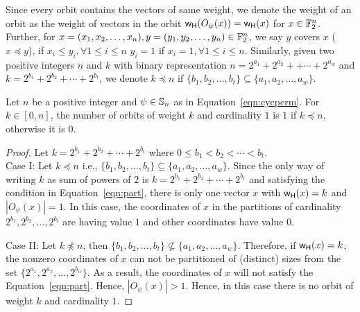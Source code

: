 \documentclass{llncs}
\begin{document}
\iffalse
\begin{proof}
For a vector $x \in \F_2^n$ is having an orbit of cardinality $1$ i.e., $|O_\psi(x)| = 1$ if and only if the coordinates of $x$ present in the cycles are of same value i.e., 
\begin{align}\label{eqn:part}
 & x_1  = x_2 = \ldots = x_{n_1}; \nonumber\\
 & x_{n_1+1}  = x_{n_1+2} = \ldots = x_{n_1+n_2}; \nonumber\\
& \vdots \\
 & x_{n-n_w+1}  = x_{n-n_w+2} = \ldots = x_n. \nonumber
\end{align}
As each partition of coordinates can be either $0$ or $1$, there are $2^w$ vectors $x$ in $\F_2^n$ satisfying Equation~\ref{eqn:part} and hence $|O_\psi(x)| = 1$.
\end{proof}
\fi
Since every orbit contains the vectors of same weight, we denote the weight of an orbit as the weight of vectors in the orbit \ie $\mathsf{w_H}(O_\psi(x)) = \mathsf{w_H}(x)$ for $x \in \F_2^n$. Further, for $x = (x_1, x_2,\ldots, x_n), y = (y_1, y_2, \ldots, y_n) \in \mathbb{F}_2^n$, we say $y$ covers $x$ (\ie $x \preceq y $), if $x_{i} \leq y_{i}, \forall 1 \leq i \leq n$ \ie $y_i = 1$ if $x_i = 1, \forall 1 \leq i \leq n$.
Similarly, given two positive integers $n$ and $k$ with binary representation $n = 2^{a_1} + 2^{a_2} + + \cdots + 2^{a_w}$ and $k = 2^{b_1}+ 2^{b_2} + \cdots + 2^{b_t}$, we denote $k \preceq n$ if $\{b_1, b_2, \ldots, b_t\} \subseteq \{a_1, a_2, \ldots, a_w\}$.
\begin{lemma}
Let $n$ be a positive integer and $\psi \in \mathbb{S}_n$ as in Equation~\ref{eqn:cycperm}. For $k \in [0,n]$, the number of orbits of weight $k$ and cardinality $1$ is $1$ if $k \preceq n$, otherwise it is $0$.
\end{lemma}
\iffalse
\begin{proof}
Let $k = 2^{b_1}+ 2^{b_2} + \cdots + 2^{b_t}$ where $0 \leq b_1 < b_2 < \cdots < b_t$.\\
Case I: Let $k \preceq n$ i.e., $\{b_1, b_2, \ldots, b_t\} \subseteq \{a_1, a_2, \ldots, a_w\}$. Since the only way of writing $k$ as sum of powers of $2$ is $k = 2^{b_1}+ 2^{b_2} + \cdots + 2^{b_t}$ and satisfying the condition in Equation~\ref{eqn:part}, there is only one vector $x$ with $\mathsf{w_H}(x) = k$ and $|O_\psi(x)| = 1$. In this case, the coordinates of $x$ in the partitions of cardinality $2^{b_1}, 2^{b_2}, \ldots, 2^{b_t}$ are having value $1$ and other coordinates have value $0$.

\noindent Case II: Let $k \not\preceq n$, then $\{b_1, b_2, \ldots, b_t\} \not \subseteq \{a_1, a_2, \ldots, a_w\}$. Therefore, if $\mathsf{w_H}(x) = k$, the nonzero coordinates of $x$ can not be partitioned of (distinct) sizes from the set $\{2^{a_1}, 2^{a_2}, \ldots, 2^{b_w}\}$.
As a result, the coordinates of $x$ will not satisfy the Equation~\ref{eqn:part}. Hence,
$|O_\psi(x)| > 1$. Hence, in this case there is no orbit of weight $k$ and cardinality $1$.
\end{proof}
\end{document}
